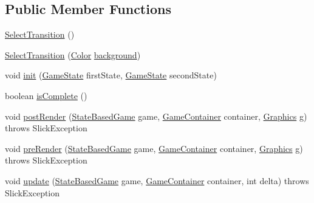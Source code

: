 \subsection*{Public Member Functions}
\begin{DoxyCompactItemize}
\item 
\mbox{\hyperlink{classorg_1_1newdawn_1_1slick_1_1state_1_1transition_1_1_select_transition_ab79fd508a0e53fb5a143163ee86c8aef}{Select\+Transition}} ()
\item 
\mbox{\hyperlink{classorg_1_1newdawn_1_1slick_1_1state_1_1transition_1_1_select_transition_afaaf374966651127f29606e08d97fb68}{Select\+Transition}} (\mbox{\hyperlink{classorg_1_1newdawn_1_1slick_1_1_color}{Color}} \mbox{\hyperlink{classorg_1_1newdawn_1_1slick_1_1state_1_1transition_1_1_select_transition_ada67cc158242a846499be282dfa2c53b}{background}})
\item 
void \mbox{\hyperlink{classorg_1_1newdawn_1_1slick_1_1state_1_1transition_1_1_select_transition_aead0953842e8e95346fb683d5825887d}{init}} (\mbox{\hyperlink{interfaceorg_1_1newdawn_1_1slick_1_1state_1_1_game_state}{Game\+State}} first\+State, \mbox{\hyperlink{interfaceorg_1_1newdawn_1_1slick_1_1state_1_1_game_state}{Game\+State}} second\+State)
\item 
boolean \mbox{\hyperlink{classorg_1_1newdawn_1_1slick_1_1state_1_1transition_1_1_select_transition_a796e76c619629c113f7e1ccd312f3806}{is\+Complete}} ()
\item 
void \mbox{\hyperlink{classorg_1_1newdawn_1_1slick_1_1state_1_1transition_1_1_select_transition_ab8383cc1738214b1408eef07cab39df1}{post\+Render}} (\mbox{\hyperlink{classorg_1_1newdawn_1_1slick_1_1state_1_1_state_based_game}{State\+Based\+Game}} game, \mbox{\hyperlink{classorg_1_1newdawn_1_1slick_1_1_game_container}{Game\+Container}} container, \mbox{\hyperlink{classorg_1_1newdawn_1_1slick_1_1_graphics}{Graphics}} g)  throws Slick\+Exception 
\item 
void \mbox{\hyperlink{classorg_1_1newdawn_1_1slick_1_1state_1_1transition_1_1_select_transition_a3d694958bbeb595e3a962f9c1bd4da08}{pre\+Render}} (\mbox{\hyperlink{classorg_1_1newdawn_1_1slick_1_1state_1_1_state_based_game}{State\+Based\+Game}} game, \mbox{\hyperlink{classorg_1_1newdawn_1_1slick_1_1_game_container}{Game\+Container}} container, \mbox{\hyperlink{classorg_1_1newdawn_1_1slick_1_1_graphics}{Graphics}} g)  throws Slick\+Exception 
\item 
void \mbox{\hyperlink{classorg_1_1newdawn_1_1slick_1_1state_1_1transition_1_1_select_transition_a17304499adede77a5323e747aee6bcdd}{update}} (\mbox{\hyperlink{classorg_1_1newdawn_1_1slick_1_1state_1_1_state_based_game}{State\+Based\+Game}} game, \mbox{\hyperlink{classorg_1_1newdawn_1_1slick_1_1_game_container}{Game\+Container}} container, int delta)  throws Slick\+Exception 
\end{DoxyCompactItemize}
